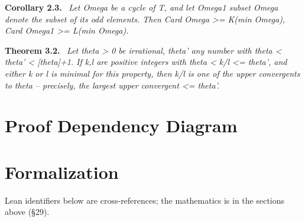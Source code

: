 \documentclass[11pt]{article}
\newenvironment{sourceresult}[1]{\par\medskip\noindent\textbf{#1.}\ \itshape}{\par\medskip}
\begin{document}
\begin{sourceresult}{Corollary 2.3}
Let Omega be a cycle of T, and let Omega1 subset Omega denote the subset of its odd elements. Then Card Omega >= K(min Omega), Card Omega1 >= L(min Omega).
\end{sourceresult}
\begin{sourceresult}{Theorem 3.2}
Let theta > 0 be irrational, theta' any number with theta < theta' < [theta]+1. If k,l are positive integers with theta < k/l <= theta', and either k or l is minimal for this property, then k/l is one of the upper convergents to theta -- precisely, the largest upper convergent <= theta'.
\end{sourceresult}
\section{Proof Dependency Diagram}
\begin{center}
\end{center}
\section{Formalization}
Lean identifiers below are cross-references; the mathematics is in the sections above (\S{}29).
\end{document}
